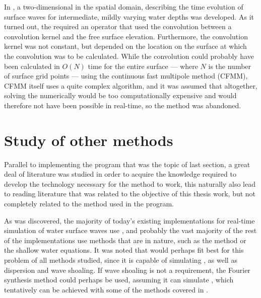 In , a two-dimensional \PDE in the spatial domain, describing the time evolution of surface waves for intermediate, mildly varying water depths was developed. As it turned out, the \PDE required an operator that used the convolution between a convolution kernel and the free surface elevation. Furthermore, the convolution kernel was not constant, but depended on the location on the surface at which the convolution was to be calculated. While the convolution could probably have been calculated in $O(N)$ time for the entire surface --- where $N$ is the number of surface grid points --- using the continuous fast multipole method (CFMM), CFMM itself uses a quite complex algorithm, and it was assumed that altogether, solving the \PDE numerically would be too computationally expensive and would therefore not have been possible in real-time, so the method was abandoned.

\section{Study of other methods}

Parallel to implementing the program that was the topic of last section, a great deal of literature was studied in order to acquire the knowledge required to develop the technology necessary for the method to work, this naturally also lead to reading literature that was related to the objective of this thesis work, but not completely related to the method used in the program.

As was discovered, the majority of today's existing implementations for real-time simulation of water surface waves use , and probably the vast majority of the rest of the implementations use methods that are  in nature, such as the \LPD method or the shallow water equations. It was noted that \LPD would perhaps fit best for this problem of all methods studied, since it is capable of simulating \FSI, as well as dispersion and wave shoaling. If wave shoaling is not a requirement, the Fourier synthesis method could perhaps be used, assuming it can simulate \FSI, which tentatively can be achieved with some of the methods covered in .